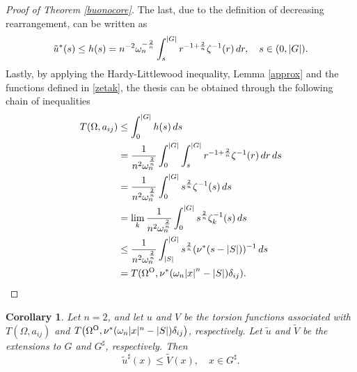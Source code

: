 \documentclass[oneside,a4paper,11pt,notitlepage]{article}
\newcommand{\abs}[1]{{\left|#1\right|}}
\theoremstyle{definition}
\theoremstyle{plain}
\newtheorem{corollario}[theorem]{Corollary}
\theoremstyle{definition}
\newcommand{\OO}{\text{\normalfont  O}}
\begin{document}
\begin{proof}[Proof of Theorem \ref{buonocore}]
The last, due to the definition of decreasing rearrangement, can be written as  \begin{equation}\label{puntuale}
      \Tilde{u}^*(s)\leq h(s)=n^{-2}\omega_n^{-\frac{2}{n}}\int_s^\abs{G}r^{-1+\frac{2}{n}}\zeta^{-1}(r)\,dr,\quad s\in(0,\abs{G}).
  \end{equation}
  Lastly, by applying the Hardy-Littlewood inequality, Lemma \ref{approx} and the functions defined in \eqref{zetak}, the thesis can be obtained through the following chain of inequalities
      \begin{equation}\label{saintven}
    \begin{aligned}
        T(\Omega,a_{ij})&\leq\int_0^{\abs{G}}h(s)\, ds \\&=\frac{1}{n^2\omega_n^{\frac{2}{n}}}\int_0^{\abs{G}}\int_s^{\abs{G}}r^{-1+\frac{2}{n}}\zeta^{-1}(r)\,dr\,ds\\&=\frac{1}{n^2\omega_n^{\frac{2}{n}}}\int_0^{\abs{G}}s^\frac{2}{n}\zeta^{-1}(s)\,ds   
        \\&= \lim_k\frac{1}{n^{2}\omega_n^{\frac{2}{n}}}\int_{0}^{\abs{G}}s^{\frac{2}{n}}\zeta_k^{-1}(s)\,ds\\
        &\leq\frac{1}{n^2\omega_n^{\frac{2}{n}}}\int_{\abs{S}}^{\abs{G}}s^\frac{2}{n}(\nu^*(s-\abs{S}))^{-1}\,ds\\&=T(\Omega^\OO,\nu^\ast(\omega_n \abs{x}^n -\abs{S})\delta_{ij}).
    \end{aligned}
    \end{equation}
\end{proof}
 
\begin{corollario}\label{puntualedim2}Let $n=2$, and let $u$ and $V$ be the torsion functions associated with 
$T(\Omega, a_{ij})$ and $T\!\left(\Omega^\OO, \nu^\ast(\omega_n |x|^n - |S|)\delta_{ij}\right)$, respectively.  
Let $\tilde u$ and $\tilde V$ be the extensions to $G$ and $G^\sharp$, respectively. Then
\[
\tilde u^\sharp(x) \leq \tilde V(x), \quad x \in G^\sharp.
\]
\end{corollario}
\end{document}
